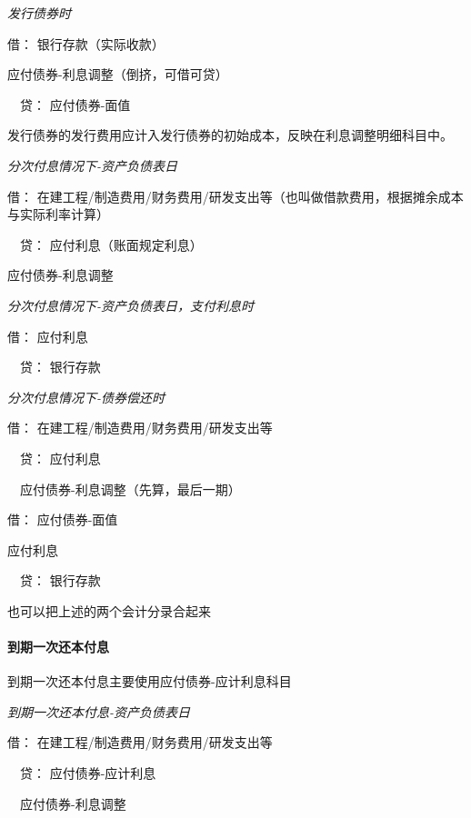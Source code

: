 \documentclass[UTF8,12pt]{ctexart}
\newenvironment{Dr}{\noindent 借：}{\par}
\newenvironment{Cr}{\noindent \ \ 贷：}{\par}
\numberwithin{equation}{section} %
\numberwithin{figure}{section}
\numberwithin{table}{section}
\begin{document}
	\textit{发行债券时}
	
	\begin{Dr}
		银行存款（实际收款）
		
		应付债券-利息调整（倒挤，可借可贷）
	\end{Dr}
	\begin{Cr}
		应付债券-面值
	\end{Cr}

	发行债券的发行费用应计入发行债券的初始成本，反映在利息调整明细科目中。
	
	\textit{分次付息情况下-资产负债表日}
	
	\begin{Dr}
		在建工程/制造费用/财务费用/研发支出等（也叫做借款费用，根据摊余成本与实际利率计算）
	\end{Dr}
	\begin{Cr}
		应付利息（账面规定利息）
		
		应付债券-利息调整
	\end{Cr}
	
	\textit{分次付息情况下-资产负债表日，支付利息时}

	\begin{Dr}
		应付利息
	\end{Dr}
	\begin{Cr}
		银行存款
	\end{Cr}

	\textit{分次付息情况下-债券偿还时}
	
	\begin{Dr}
		在建工程/制造费用/财务费用/研发支出等
	\end{Dr}
	\begin{Cr}
		应付利息
		
		\ \ 应付债券-利息调整（先算，最后一期）
	\end{Cr}
	\begin{Dr}
		应付债券-面值
		
		应付利息
	\end{Dr}
	\begin{Cr}
		银行存款
	\end{Cr}
	也可以把上述的两个会计分录合起来

	\paragraph{到期一次还本付息} 到期一次还本付息主要使用应付债券-应计利息科目

	\textit{到期一次还本付息-资产负债表日}
	
	\begin{Dr}
		在建工程/制造费用/财务费用/研发支出等
	\end{Dr}
	\begin{Cr}
		应付债券-应计利息
		
		\ \ 应付债券-利息调整
	\end{Cr}
	
\end{document}
